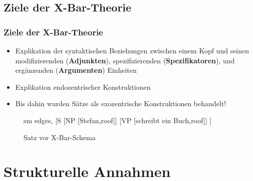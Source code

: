 \subsection{Ziele der X-Bar-Theorie}


\begin{frame}
\frametitle{Ziele der X-Bar-Theorie}

\begin{itemize}
	\item Explikation der syntaktischen Beziehungen zwischen einem Kopf und seinen modifizierenden (\textbf{Adjunkten}), spezifizierenden (\textbf{Spezifikatoren}), und ergänzenden (\textbf{Argumenten}) Einheiten
	\item Explikation endozentrischer Konstruktionen
	\item Bis dahin wurden Sätze als exozentrische Konstruktionen behandelt!
\end{itemize}

\begin{figure}[b]
	\begin{minipage}[b]{0.05\textwidth}
	\end{minipage} 
	\begin{minipage}[b]{0.50\textwidth}
	\centering
	\footnotesize{
		\begin{forest}
		sm edges,
		[S	[NP [Stefan,roof]]
			[VP [schreibt ein Buch,roof]]
		]
		\end{forest}
		}
		\caption{Satz vor X-Bar-Schema}	
  	\end{minipage}  
	\begin{minipage}[b]{0.05\textwidth}
  	\end{minipage}
  	
\end{figure}

\end{frame}


\section{Strukturelle Annahmen}

